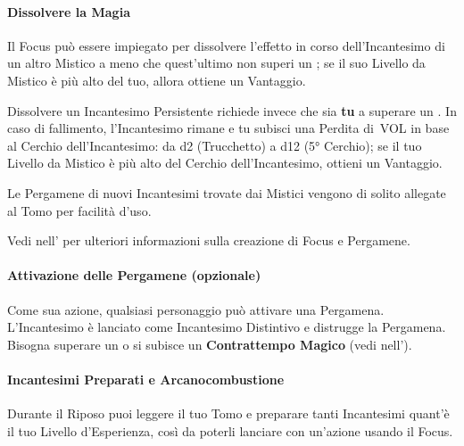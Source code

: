 \documentclass[itdr]{subfiles}
\begin{document}
\paragraph{Dissolvere la Magia}
Il Focus può essere impiegato per dissolvere l’effetto in corso dell’Incantesimo di un altro Mistico a meno che quest’ultimo non superi un ; se il suo Livello da Mistico è più alto del tuo, allora ottiene un Vantaggio. 

Dissolvere un Incantesimo Persistente richiede invece che sia \textbf{tu} a superare un . In caso di fallimento, l’Incantesimo rimane e tu subisci una Perdita di~VOL in base al Cerchio dell’Incantesimo: da d2 (Trucchetto) a d12 (5° Cerchio); se il tuo Livello da Mistico è più alto del Cerchio dell’Incantesimo, ottieni un Vantaggio.

\vfill
\begin{dbox}
	Le Pergamene di nuovi Incantesimi trovate dai Mistici vengono di solito allegate al Tomo per facilità d’uso.

	Vedi \textbf{} nell'\mbox{\textbf{}} per ulteriori informazioni sulla creazione di Focus e Pergamene.
\end{dbox}

\vfill
{}
\begin{dbox}
	\paragraph{Attivazione delle Pergamene (opzionale)}
	Come sua azione, qualsiasi personaggio può attivare una Pergamena. L’Incantesimo è lanciato come Incantesimo Distintivo e distrugge la Pergamena. Bisogna superare un  o si subisce un \textbf{Contrattempo Magico} (vedi \textbf{} nell'\textbf{}).
\end{dbox}

\vfill

\paragraph{Incantesimi Preparati e Arcanocombustione}
Durante il Riposo puoi leggere il tuo Tomo e preparare tanti Incantesimi quant'è il tuo Livello d’Esperienza, così da poterli lanciare con un’azione usando il Focus.
\end{document}
